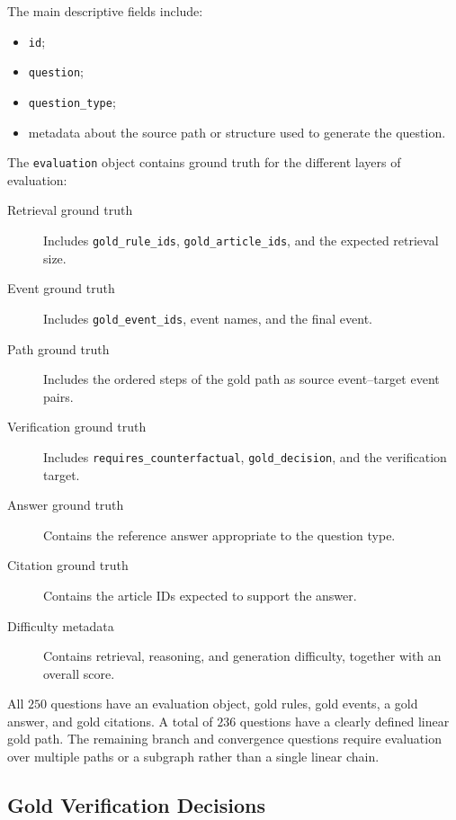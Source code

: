 The main descriptive fields include:

\begin{itemize}
    \item \texttt{id};
    \item \texttt{question};
    \item \texttt{question\_type};
    \item metadata about the source path or structure used to generate the
    question.
\end{itemize}

The \texttt{evaluation} object contains ground truth for the different
layers of evaluation:

\begin{description}
    \item[Retrieval ground truth]
    Includes \texttt{gold\_rule\_ids},
    \texttt{gold\_article\_ids}, and the expected retrieval size.

    \item[Event ground truth]
    Includes \texttt{gold\_event\_ids}, event names, and the final event.

    \item[Path ground truth]
    Includes the ordered steps of the gold path as source event--target event
    pairs.

    \item[Verification ground truth]
    Includes \texttt{requires\_counterfactual},
    \texttt{gold\_decision}, and the verification target.

    \item[Answer ground truth]
    Contains the reference answer appropriate to the question type.

    \item[Citation ground truth]
    Contains the article IDs expected to support the answer.

    \item[Difficulty metadata]
    Contains retrieval, reasoning, and generation difficulty, together with an
    overall score.
\end{description}

All \(250\) questions have an evaluation object, gold rules, gold events, a
gold answer, and gold citations. A total of \(236\) questions have a clearly
defined linear gold path. The remaining branch and convergence questions
require evaluation over multiple paths or a subgraph rather than a single
linear chain.

\subsection{Gold Verification Decisions}

